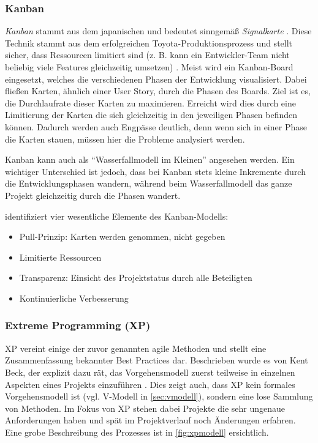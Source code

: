\subsubsection{Kanban}

\emph{Kanban} stammt aus dem japanischen und bedeutet sinngemäß \emph{Signalkarte} \parencite[vgl.][S. 23f.]{Epping:2011aa}.
Diese Technik stammt aus dem erfolgreichen Toyota-Produktionsprozess und stellt sicher, dass Ressourcen limitiert sind (z. B. kann ein Entwickler-Team nicht beliebig viele Features gleichzeitig umsetzen) \parencite[vgl.][S. 33f.]{Epping:2011aa}.
Meist wird ein Kanban-Board eingesetzt, welches die verschiedenen Phasen der Entwicklung visualisiert.
Dabei fließen Karten, ähnlich einer User Story, durch die Phasen des Boards.
Ziel ist es, die Durchlaufrate dieser Karten zu maximieren.
Erreicht wird dies durch eine Limitierung der Karten die sich gleichzeitig in den jeweiligen Phasen befinden können.
Dadurch werden auch Engpässe deutlich, denn wenn sich in einer Phase die Karten stauen, müssen hier die Probleme analysiert werden.

Kanban kann auch als \enquote{Wasserfallmodell im Kleinen} angesehen werden.
Ein wichtiger Unterschied ist jedoch, dass bei Kanban stets kleine Inkremente durch die Entwicklungsphasen wandern, während beim Wasserfallmodell das ganze Projekt gleichzeitig durch die Phasen wandert.

\parencite[][S. 54]{Epping:2011aa} identifiziert vier wesentliche Elemente des Kanban-Modells:

\begin{itemize}
\item Pull-Prinzip: Karten werden genommen, nicht gegeben
\item Limitierte Ressourcen
\item Transparenz: Einsicht des Projektstatus durch alle Beteiligten
\item Kontinuierliche Verbesserung
\end{itemize}

\subsubsection{Extreme Programming (XP)}

XP vereint einige der zuvor genannten agile Methoden und stellt eine Zusammenfassung bekannter Best Practices dar.
Beschrieben wurde es von Kent Beck, der explizit dazu rät, das Vorgehensmodell zuerst teilweise in einzelnen Aspekten eines Projekts einzuführen \parencite[vgl.][S. 77]{Beck:1999aa}.
Dies zeigt auch, dass XP kein formales Vorgehensmodell ist (vgl. V-Modell in \autoref{sec:vmodell}), sondern eine lose Sammlung von Methoden.
Im Fokus von XP stehen dabei Projekte die sehr ungenaue Anforderungen haben und spät im Projektverlauf noch Änderungen erfahren.
Eine grobe Beschreibung des Prozesses ist in \autoref{fig:xpmodell} ersichtlich. 


